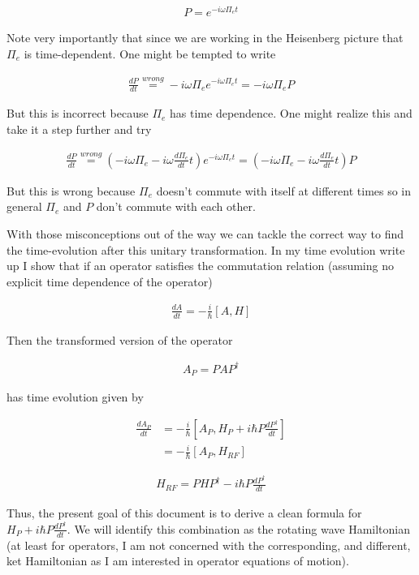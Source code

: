 \documentclass[12pt]{article}
\newcommand{\ddt}[1]{\frac{d #1}{dt}}
\begin{document}
\begin{align}
P = e^{-i\omega \Pi_e t} 
\end{align}

Note very importantly that since we are working in the Heisenberg picture that $\Pi_e$ is time-dependent. One might be tempted to write

\begin{align}
\ddt{P} \stackrel{wrong}{=} -i\omega \Pi_e e^{-i\omega \Pi_e t} = -i\omega \Pi_e P
\end{align}

But this is incorrect because $\Pi_e$ has time dependence. One might realize this and take it a step further and try

\begin{align}
\ddt{P} \stackrel{wrong}{=} \left(-i\omega \Pi_e -i \omega \ddt{\Pi_e} t\right)e^{-i\omega \Pi_e t} = \left(-i\omega \Pi_e -i \omega \ddt{\Pi_e} t\right)P
\end{align}

But this is wrong because $\Pi_e$ doesn't commute with itself at different times so in general $\Pi_e$ and $P$ don't commute with each other.

With those misconceptions out of the way we can tackle the correct way to find the time-evolution after this unitary transformation. In my time evolution write up I show that if an operator satisfies the commutation relation (assuming no explicit time dependence of the operator)

\begin{align}
\ddt{A} = -\frac{i}{\hbar}[A,H]
\end{align}

Then the transformed version of the operator

\begin{align}
A_P = PAP^{\dag}
\end{align}

has time evolution given by

\begin{align}
\ddt{A_P} &= -\frac{i}{\hbar}\left[A_P,H_P+i\hbar P \ddt{P^{\dag}}\right]\\
&= -\frac{i}{\hbar}[A_P, H_{RF}]
\end{align}

\begin{align}
H_{RF} = PH P^{\dag} - i \hbar P \ddt{P^{\dag}}
\end{align}

Thus, the present goal of this document is to derive a clean formula for $H_P + i\hbar P \ddt{P^{\dag}}$. We will identify this combination as the rotating wave Hamiltonian (at least for operators, I am not concerned with the corresponding, and different, ket Hamiltonian as I am interested in operator equations of motion).
\end{document}

